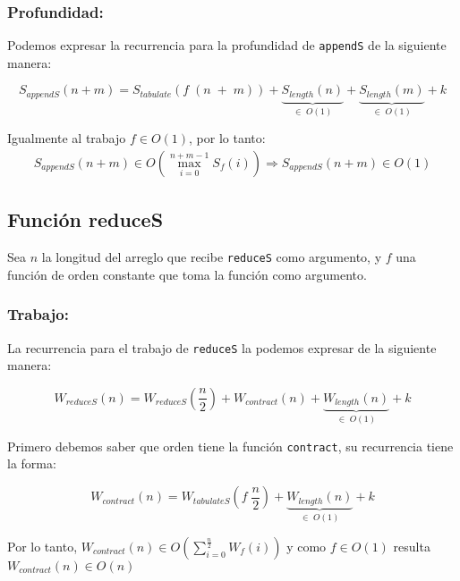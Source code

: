 \documentclass[11pt]{article}
\begin{document}
\subsubsection{Profundidad:}
Podemos expresar la recurrencia para la profundidad de \texttt{appendS} de 
la siguiente manera:

\begin{equation*}
    S_{appendS}(n + m) = S_{tabulate}(f \; (n \; +\; m)) + \underbrace{S_{length}(n)}_{\in \; O(1)}
    + \underbrace{S_{length}(m)}_{\in \; O(1)} + k
\end{equation*}

Igualmente al trabajo $f \in O(1)$, por lo tanto:
\begin{align*}
    S_{appendS}(n + m) \in O\left(\displaystyle\max_{i=0}^{n + m - 1}S_f(i)\right)
    \Rightarrow S_{appendS}(n + m) \in O(1)
\end{align*}


\subsection{Función reduceS}

Sea $n$ la longitud del arreglo que recibe \texttt{reduceS} como argumento, y $f$
una función de orden constante que toma la función como argumento.

\subsubsection{Trabajo:}

La recurrencia para el trabajo de \texttt{reduceS} la podemos expresar de
la siguiente manera:

\begin{equation*}
    W_{reduceS}(n) =  W_{reduceS}(\frac{n}{2}) + W_{contract}(n) + \underbrace{W_{length}(n)}_{\in \; O(1)} + k
\end{equation*}

Primero debemos saber que orden tiene la función \texttt{contract}, su recurrencia
tiene la forma:

\begin{equation*}
    W_{contract}(n) = W_{tabulateS}(f \; \frac{n}{2}) + \underbrace{W_{length}(n)}_{\in \; O(1)} + k
\end{equation*}

Por lo tanto, $W_{contract}(n) \in O\left(\displaystyle\sum_{i=0}^{\frac{n}{2}}W_f(i)\right) $
y como $f\in O(1)$ resulta $W_{contract}(n) \in O(n)$
\end{document}
